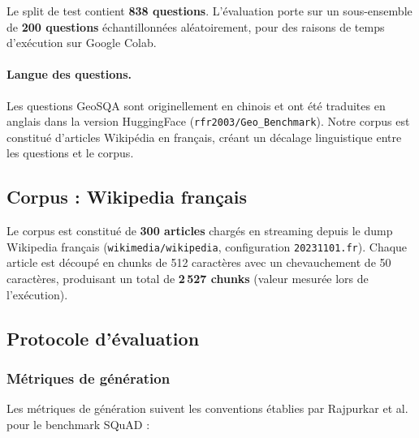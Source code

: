 \documentclass[12pt,a4paper]{article}
\begin{document}
Le split de test contient \textbf{838 questions}. L'évaluation porte sur un sous-ensemble de \textbf{200 questions} échantillonnées aléatoirement, pour des raisons de temps d'exécution sur Google Colab.

\paragraph{Langue des questions.} Les questions GeoSQA sont originellement en chinois et ont été traduites en anglais dans la version HuggingFace (\texttt{rfr2003/Geo\_Benchmark}). Notre corpus est constitué d'articles Wikipédia en français, créant un décalage linguistique entre les questions et le corpus.

\subsection{Corpus : Wikipedia français}

Le corpus est constitué de \textbf{300 articles} chargés en streaming depuis le dump Wikipedia français (\texttt{wikimedia/wikipedia}, configuration \texttt{20231101.fr}). Chaque article est découpé en chunks de 512 caractères avec un chevauchement de 50 caractères, produisant un total de \textbf{2\,527 chunks} (valeur mesurée lors de l'exécution).

\subsection{Protocole d'évaluation}

\subsubsection{Métriques de génération}

Les métriques de génération suivent les conventions établies par Rajpurkar et al.~\cite{rajpurkar2016squademnlp} pour le benchmark SQuAD :
\end{document}
